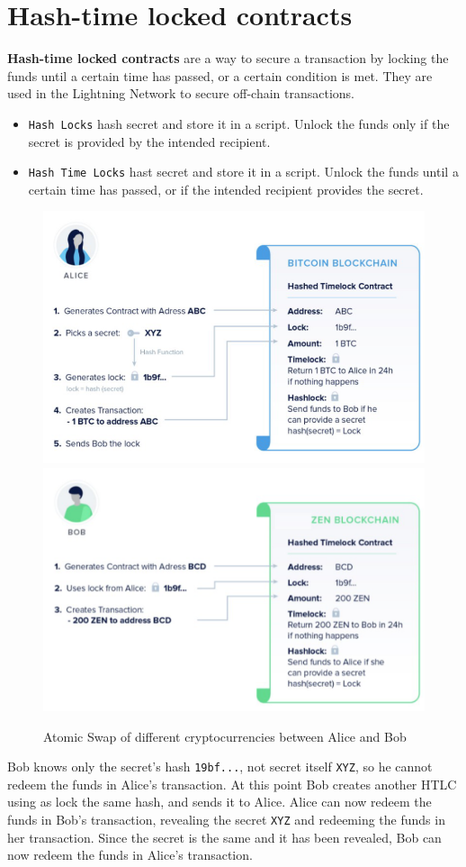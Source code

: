 \section{Hash-time locked contracts}
\textbf{Hash-time locked contracts} are a way to secure a transaction by locking the funds until a certain time has passed, or a certain condition is met. They are used in the Lightning Network to secure off-chain transactions.
\begin{itemize}
   \item \texttt{Hash Locks} hash secret and store it in a script. Unlock the funds only if the secret is provided by the intended recipient.
   \item \texttt{Hash Time Locks} hast secret and store it in a script. Unlock the funds until a certain time has passed, or if the intended recipient provides the secret.
\end{itemize}

\begin{figure}[htbp]
   \centering
   \includegraphics[width=0.49\columnwidth]{images/bitcoin_htlc1.png}
   \includegraphics[width=0.49\columnwidth]{images/bitcoin_htlc2.png}
   \caption{Atomic Swap of different cryptocurrencies between Alice and Bob}
   \label{fig:bitcoin_htlc}
\end{figure}

Bob knows only the secret's hash \texttt{19bf...}, not secret itself \texttt{XYZ}, so he cannot redeem the funds in Alice's transaction. At this point Bob creates another HTLC using as lock the same hash, and sends it to Alice. Alice can now redeem the funds in Bob's transaction, revealing the secret \texttt{XYZ} and redeeming the funds in her transaction.
Since the secret is the same and it has been revealed, Bob can now redeem the funds in Alice's transaction.

